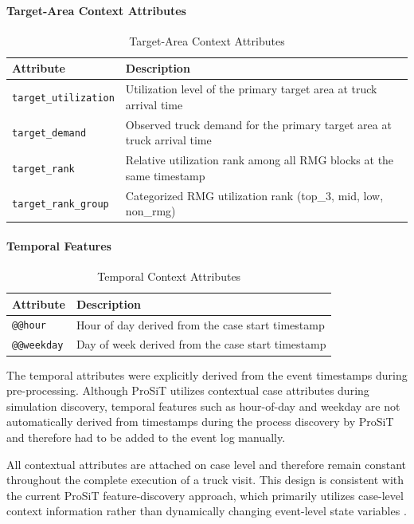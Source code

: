     \paragraph{Target-Area Context Attributes} 
    \begin{table}[h] 
    \centering 
    \caption{Target-Area Context Attributes} 
    \begin{tabular}{p{4cm} p{9cm}} 
    \hline \textbf{Attribute} & \textbf{Description} \\ \hline \texttt{target\_utilization} & Utilization level of the primary target area at truck arrival time \\ \texttt{target\_demand} & Observed truck demand for the primary target area at truck arrival time \\ \texttt{target\_rank} & Relative utilization rank among all RMG blocks at the same timestamp \\ \texttt{target\_rank\_group} & Categorized RMG utilization rank (top\_3, mid, low, non\_rmg) \\ \hline 
    \end{tabular} 
    \end{table}

    
   \paragraph{Temporal Features} 
   \begin{table}[h] 
   \centering 
   \caption{Temporal Context Attributes} 
   \begin{tabular}{p{4cm} p{9cm}} \hline \textbf{Attribute} & \textbf{Description} \\ \hline \texttt{@@hour} & Hour of day derived from the case start timestamp \\ \texttt{@@weekday} & Day of week derived from the case start timestamp \\ \hline 
   \end{tabular}
   \end{table}
   
   The temporal attributes were explicitly derived from the event timestamps during pre-processing. Although ProSiT utilizes contextual case attributes during simulation discovery, temporal features such as hour-of-day and weekday are not automatically derived from timestamps during the process discovery by ProSiT and therefore had to be added to the event log manually.

    All contextual attributes are attached on case level and therefore remain constant throughout the complete execution of a truck visit. This design is consistent with the current ProSiT feature-discovery approach, which primarily utilizes case-level context information rather than dynamically changing event-level state variables \cite{Vinci2026prosit}.
    
